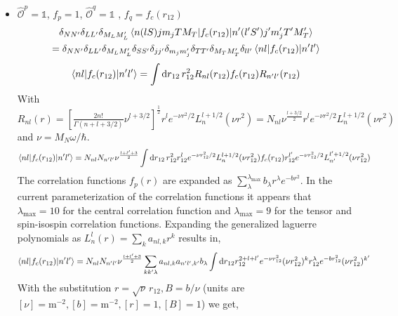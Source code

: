 \documentclass[10pt]{article}
\begin{document}
\begin{itemize}
	\item $\hat{\mathcal{O}}^{p} = \mathbb{1}$, $f_{p} = 1$, $\hat{\mathcal{O}}^{q} = \mathbb{1}$ , $f_{q} = f_c(r_{12})$ 
	\begin{multline*}
		\delta_{NN'} \delta_{LL'} \delta_{M_L M_L'} \braket{ n (l S) j m_j T M_T |  f_{c}(r_{12}) | n' (l' S') j' m_j' T' M_T'}  \\
		= \delta_{NN'} \delta_{LL'} \delta_{M_L M_L'} \delta_{SS'} \delta_{jj'} \delta_{m_j m_j'} \delta_{TT'} \delta_{M_T M_T'} \delta_{l l'} \braket{ n l |  f_{c}(r_{12}) | n' l'} 
	\end{multline*}
	\begin{multline*}
		\braket{ n l |  f_{c}(r_{12}) | n' l'} = \int \text{d} r_{12} \, r_{12}^{2} R_{nl}(r_{12}) f_{c}(r_{12}) R_{n'l'}(r_{12}) \\
	\end{multline*}
	With  $R_{nl}(r) = \left[ \frac{2n!}{\Gamma(n + l + 3/2)} \nu^{l + 3/2} \right]^{\frac{1}{2}} r^{l} e^{-\nu r^{2} /2} L_{n}^{l+1/2}(\nu r^{2}) = N_{nl} \nu^{\frac{l + 3/2}{2}} r^{l} e^{-\nu r^{2} /2} L_{n}^{l+1/2}(\nu r^{2})$ and $ \nu = M_N \omega / \hbar $.
	\begin{multline*}
		\braket{ n l |  f_{c}(r_{12}) | n' l'} = N_{nl} N_{n'l'} \nu^{\frac{l + l' + 3}{2}} \int \text{d} r_{12} \, r_{12}^{2} r_{12}^{l} e^{-\nu r_{12}^{2} /2} L_{n}^{l+1/2}(\nu r_{12}^{2}) f_{c}(r_{12}) r_{12}^{l'} e^{-\nu r_{12}^{2} /2} L_{n'}^{l'+1/2}(\nu r_{12}^{2}) \\
	\end{multline*}
	The correlation functions $f_{p}(r)$ are expanded as $ \sum_{\lambda}^{\lambda_{\text{max}}} b_{\lambda} r^{\lambda} e^{-b r^{2}}$.
	In the current parameterization of the correlation functions it appears that $\lambda_{\text{max}} = 10$ for the central correlation function and $\lambda_{\text{max}}=9$ for the tensor and spin-isospin correlation functions.
	Expanding the generalized laguerre polynomials as $ L_{n}^{l}(r) = \sum_{k} a_{nl,k} r^{k}$ results in,
	\begin{multline*}
		\braket{ n l |  f_{c}(r_{12}) | n' l'} = N_{nl} N_{n'l'} \nu^{\frac{l + l' + 3}{2}} \sum_{kk'\lambda} a_{nl,k} a_{n'l',k'} b_{\lambda}  \int \text{d} r_{12} r_{12}^{2+l+l'} e^{-\nu r_{12}^{2}} ( \nu r_{12}^{2} )^{k} r_{12}^{\lambda} e^{-b r_{12}^{2}} ( \nu r_{12}^{2})^{k'}
	\end{multline*}
	With the substitution $r = \sqrt{\nu} \, r_{12}, B = b/\nu$ (units are $[\nu] = \text{m}^{-2}, [b] = \text{m}^{-2}, [r] = 1, [B] = 1$) we get,

\end{itemize}
\end{document}
